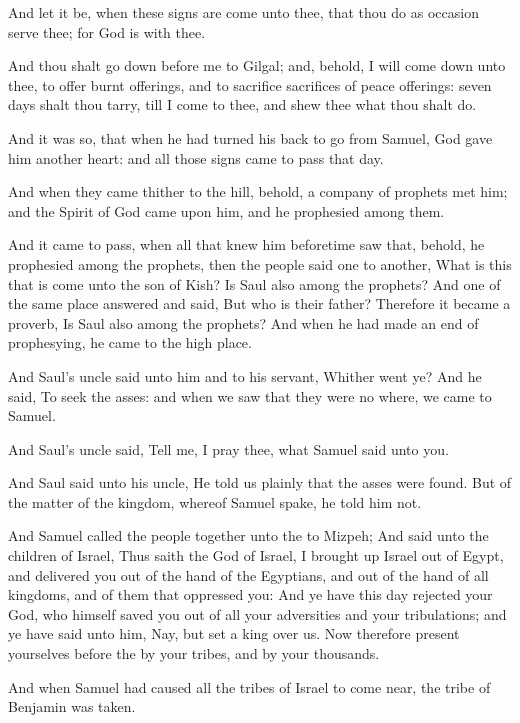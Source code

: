 \verse And let it be, when these signs are come unto thee, that thou do as occasion serve thee; for God is with thee.

\verse And thou shalt go down before me to Gilgal; and, behold, I will come down unto thee, to offer burnt offerings, and to sacrifice sacrifices of peace offerings: seven days shalt thou tarry, till I come to thee, and shew thee what thou shalt do.

\verse And it was so, that when he had turned his back to go from Samuel, God gave him another heart: and all those signs came to pass that day.

\verse And when they came thither to the hill, behold, a company of prophets met him; and the Spirit of God came upon him, and he prophesied among them.

\verse And it came to pass, when all that knew him beforetime saw that, behold, he prophesied among the prophets, then the people said one to another, What is this that is come unto the son of Kish? Is Saul also among the prophets?  \verse And one of the same place answered and said, But who is their father? Therefore it became a proverb, Is Saul also among the prophets?  \verse And when he had made an end of prophesying, he came to the high place.

\verse And Saul's uncle said unto him and to his servant, Whither went ye?  And he said, To seek the asses: and when we saw that they were no where, we came to Samuel.

\verse And Saul's uncle said, Tell me, I pray thee, what Samuel said unto you.

\verse And Saul said unto his uncle, He told us plainly that the asses were found. But of the matter of the kingdom, whereof Samuel spake, he told him not.

\verse And Samuel called the people together unto the \LORD to Mizpeh; \verse And said unto the children of Israel, Thus saith the \LORD God of Israel, I brought up Israel out of Egypt, and delivered you out of the hand of the Egyptians, and out of the hand of all kingdoms, and of them that oppressed you: \verse And ye have this day rejected your God, who himself saved you out of all your adversities and your tribulations; and ye have said unto him, Nay, but set a king over us.  Now therefore present yourselves before the \LORD by your tribes, and by your thousands.

\verse And when Samuel had caused all the tribes of Israel to come near, the tribe of Benjamin was taken.

